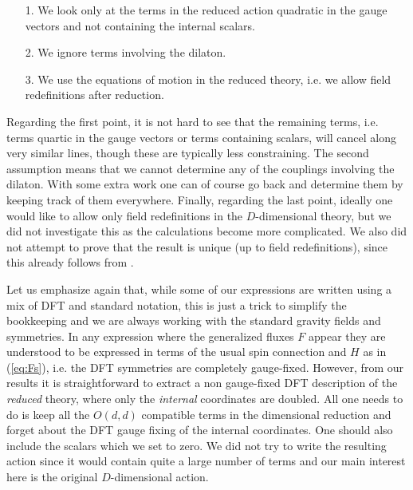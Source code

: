 \documentclass[a4paper,11pt]{article}
\begin{document}
\begin{itemize}
	\item[1.] We look only at the terms in the reduced action quadratic in the gauge vectors and not containing the internal scalars.
	\item[2.] We ignore terms involving the dilaton.
	\item[3.] We use the equations of motion in the reduced theory, i.e. we allow field redefinitions after reduction.
\end{itemize}
Regarding the first point, it is not hard to see that the remaining terms, i.e. terms quartic in the gauge vectors or terms containing scalars, will cancel along very similar lines, though these are typically less constraining. The second assumption means that we cannot determine any of the couplings involving the dilaton. With some extra work one can of course go back and determine them by keeping track of them everywhere. Finally, regarding the last point, ideally one would like to allow only field redefinitions in the $D$-dimensional theory, but we did not investigate this as the calculations become more complicated. We also did not attempt to prove that the result is unique (up to field redefinitions), since this already follows from \cite{Garousi:2020gio}.

Let us emphasize again that, while some of our expressions are written using a mix of DFT and standard notation, this is just a trick to simplify the bookkeeping and we are always working with the standard gravity fields and symmetries. In any expression where the generalized fluxes $F$ appear they are understood to be expressed in terms of the usual spin connection and $H$ as in (\ref{eq:Fs}), i.e. the DFT symmetries are completely gauge-fixed. {However, from our results it is straightforward to extract a non gauge-fixed DFT description of the \emph{reduced} theory, where only the \emph{internal} coordinates are doubled. All one needs to do is keep all the $O(d,d)$ compatible terms in the dimensional reduction and forget about the DFT gauge fixing of the internal coordinates. One should also include the scalars which we set to zero. We did not try to write the resulting action since it would contain quite a large number of terms and our main interest here is the original $D$-dimensional action.}
\end{document}
